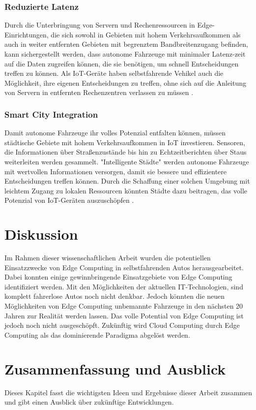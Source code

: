 \documentclass{sigchi}
\begin{document}
\subsubsection{Reduzierte Latenz}
Durch die Unterbringung von Servern und Rechenressourcen in Edge-Einrichtungen, die sich sowohl in Gebieten mit hohem Verkehrsaufkommen als auch in weiter entfernten Gebieten mit begrenztem Bandbreitenzugang befinden, kann sichergestellt werden, dass autonome Fahrzeuge mit minimaler Latenz-zeit auf die Daten zugreifen können, die sie benötigen, um schnell Entscheidungen treffen zu können. Als IoT-Geräte haben selbstfahrende Vehikel auch die Möglichkeit, ihre eigenen Entscheidungen zu treffen, ohne sich auf die Anleitung von Servern in entfernten Rechenzentren verlassen zu müssen \cite{5-use-cases:2019}.

\subsubsection{Smart City Integration}
Damit autonome Fahrzeuge ihr volles Potenzial entfalten können, müssen städtische Gebiete mit hohem Verkehrsaufkommen in IoT investieren. Sensoren, die Informationen über Straßenzustände bis hin zu Echtzeitberichten über Staus weiterleiten werden gesammelt. "Intelligente Städte" werden autonome Fahrzeuge mit wertvollen Informationen versorgen, damit sie bessere und effizientere Entscheidungen treffen können. Durch die Schaffung einer solchen Umgebung mit leichtem Zugang zu lokalen Ressourcen könnten Städte dazu beitragen, das volle Potenzial von IoT-Geräten auszuschöpfen \cite{5-use-cases:2019}.

\section{Diskussion} \label{chap:discussion}
Im Rahmen dieser wissenschaftlichen Arbeit wurden die potentiellen Einsatzzwecke von Edge Computing in selbstfahrenden Autos herausgearbeitet. Dabei konnten einige gewinnbringende Einsatzgebiete von Edge Computing identifiziert werden. Mit den Möglichkeiten der aktuellen IT-Technologien, sind komplett fahrerlose Autos noch nicht denkbar. Jedoch könnten die neuen Möglichkeiten von Edge Computing unbemannte Fahrzeuge in den nächsten 20 Jahren zur Realität werden lassen. Das volle Potential von Edge Computing ist jedoch noch nicht ausgeschöpft. Zukünftig wird Cloud Computing durch Edge Computing als das dominierende Paradigma abgelöst werden.

\section{Zusammenfassung und Ausblick} \label{chap:summary}
Dieses Kapitel fasst die wichtigsten Ideen und Ergebnisse dieser Arbeit zusammen und gibt einen Ausblick über zukünftige Entwicklungen.
\end{document}
